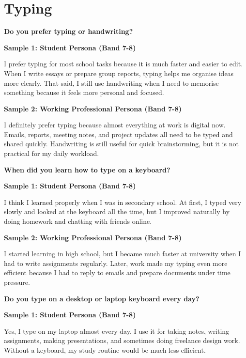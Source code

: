 \newpage

\section{Typing}
\begin{ieltsquestion}
\textbf{Do you prefer typing or handwriting?}
\end{ieltsquestion}
\textbf{Sample 1: Student Persona (Band 7-8)}

I prefer typing for most school tasks because it is much faster and easier to edit. When I write essays or prepare group reports, typing helps me organise ideas more clearly. That said, I still use handwriting when I need to memorise something because it feels more personal and focused.

\textbf{Sample 2: Working Professional Persona (Band 7-8)}

I definitely prefer typing because almost everything at work is digital now. Emails, reports, meeting notes, and project updates all need to be typed and shared quickly. Handwriting is still useful for quick brainstorming, but it is not practical for my daily workload.

\separator

\begin{ieltsquestion}
\textbf{When did you learn how to type on a keyboard?}
\end{ieltsquestion}
\textbf{Sample 1: Student Persona (Band 7-8)}

I think I learned properly when I was in secondary school. At first, I typed very slowly and looked at the keyboard all the time, but I improved naturally by doing homework and chatting with friends online.

\textbf{Sample 2: Working Professional Persona (Band 7-8)}

I started learning in high school, but I became much faster at university when I had to write assignments regularly. Later, work made my typing even more efficient because I had to reply to emails and prepare documents under time pressure.

\separator

\begin{ieltsquestion}
\textbf{Do you type on a desktop or laptop keyboard every day?}
\end{ieltsquestion}
\textbf{Sample 1: Student Persona (Band 7-8)}

Yes, I type on my laptop almost every day. I use it for taking notes, writing assignments, making presentations, and sometimes doing freelance design work. Without a keyboard, my study routine would be much less efficient.

